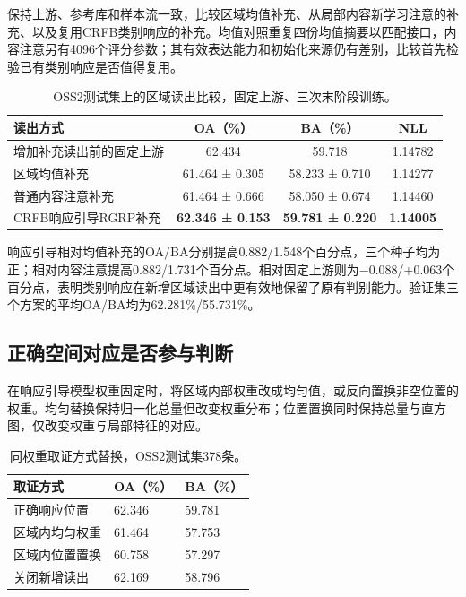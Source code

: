 \documentclass[journal,10pt,a4paper]{IEEEtran}
\begin{document}
保持上游、参考库和样本流一致，比较区域均值补充、从局部内容新学习注意的补充、以及复用CRFB类别响应的补充。均值对照重复四份均值摘要以匹配接口，内容注意另有4096个评分参数；其有效表达能力和初始化来源仍有差别，比较首先检验已有类别响应是否值得复用。

\begin{table}[H]
\centering\footnotesize
\setcounter{table}{8}
\caption{OSS2测试集上的区域读出比较，固定上游、三次末阶段训练。}
\label{tab:9}
\setlength{\tabcolsep}{3pt}\renewcommand{\arraystretch}{1.2}
\begin{tabularx}{\linewidth}{LCCC}
\toprule
读出方式 & OA（\%） & BA（\%） & NLL \\
\midrule
增加补充读出前的固定上游 & 62.434 & 59.718 & 1.14782 \\
区域均值补充 & 61.464 ± 0.305 & 58.233 ± 0.710 & 1.14277 \\
普通内容注意补充 & 61.464 ± 0.666 & 58.050 ± 0.674 & 1.14460 \\
CRFB响应引导RGRP补充 & \textbf{62.346 ± 0.153} & \textbf{59.781 ± 0.220} & \textbf{1.14005} \\
\bottomrule
\end{tabularx}
\end{table}

响应引导相对均值补充的OA/BA分别提高0.882/1.548个百分点，三个种子均为正；相对内容注意提高0.882/1.731个百分点。相对固定上游则为−0.088/+0.063个百分点，表明类别响应在新增区域读出中更有效地保留了原有判别能力。验证集三个方案的平均OA/BA均为62.281\%/55.731\%。

\subsection{正确空间对应是否参与判断}\label{ux6b63ux786eux7a7aux95f4ux5bf9ux5e94ux662fux5426ux53c2ux4e0eux5224ux65ad}

在响应引导模型权重固定时，将区域内部权重改成均匀值，或反向置换非空位置的权重。均匀替换保持归一化总量但改变权重分布；位置置换同时保持总量与直方图，仅改变权重与局部特征的对应。

\begin{table}[H]
\centering\footnotesize
\setcounter{table}{9}
\caption{同权重取证方式替换，OSS2测试集378条。}
\label{tab:10}
\setlength{\tabcolsep}{3pt}\renewcommand{\arraystretch}{1.2}
\begin{tabularx}{\linewidth}{LLL}
\toprule
取证方式 & OA（\%） & BA（\%） \\
\midrule
正确响应位置 & 62.346 & 59.781 \\
区域内均匀权重 & 61.464 & 57.753 \\
区域内位置置换 & 60.758 & 57.297 \\
关闭新增读出 & 62.169 & 58.796 \\
\bottomrule
\end{tabularx}
\end{table}
\end{document}
